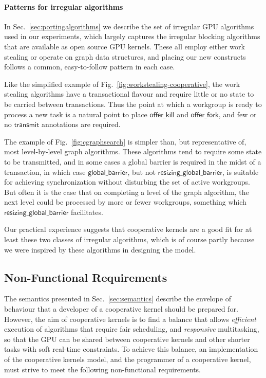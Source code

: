 \documentclass[numbers,nocopyrightspace,10pt]{sigplanconf}
\newcommand{\myfig}{Fig.~}
\newcommand{\mysec}{Sec.~}
\newcommand{\transmit}{\mathsf{transmit}}
\newcommand{\offerfork}{\mathsf{offer\_fork}}
\newcommand{\offerkill}{\mathsf{offer\_kill}}
\newcommand{\globalbarrier}{\mathsf{global\_barrier}}
\newcommand{\resizingglobalbarrier}{\mathsf{resizing\_global\_barrier}}
\begin{document}
\paragraph{Patterns for irregular algorithms}
In \mysec\ref{sec:portingalgorithms} we describe the set of irregular GPU algorithms used
in our experiments, which largely captures the irregular blocking
algorithms that are available as open source GPU kernels.  These all
employ either work stealing or operate on graph data structures, and placing our new constructs follows a common, easy-to-follow pattern in each case.

Like the simplified example of \myfig\ref{fig:workstealing-cooperative}, the work stealing algorithms have a transactional flavour
and require little or no state to be carried between transactions.  Thus the point at which a workgroup is ready to process a new task is a natural point to place $\offerkill$ and $\offerfork$, and few or no $\transmit$ annotations are required.

The example of \myfig\ref{fig:cgraphsearch} is simpler than, but representative of,
most level-by-level graph algorithms.  These algorithms tend to
require some state to be transmitted, and in some cases
a global barrier is required in the midst of a transaction, in which
case $\globalbarrier$, but not $\resizingglobalbarrier$, is suitable
for achieving synchronization without disturbing the set of active
workgroups.  But often it is the case that on completing a level of
the graph algorithm, the next level could be processed by more or
fewer workgroups, something which $\resizingglobalbarrier$
facilitates.

Our practical experience suggests that cooperative kernels are a good
fit for at least these two classes of irregular algorithms, which is
of course partly because we were inspired by these algorithms in
designing the model.


\subsection{Non-Functional Requirements}\label{sec:nonfunctional}

The semantics presented in \mysec\ref{sec:semantics} describe the envelope of
behaviour that a developer of a cooperative kernel should be prepared
for.
%
However, the aim of cooperative kernels is to find a balance that
allows \emph{efficient} execution of algorithms that require fair scheduling, and
\emph{responsive} multitasking, so that the GPU can be shared between
cooperative kernels and other shorter tasks with soft real-time constraints.
%
To achieve this balance, an implementation of the cooperative
kernels model, and the programmer of a cooperative kernel, must strive
to meet the following non-functional requirements.
\end{document}
